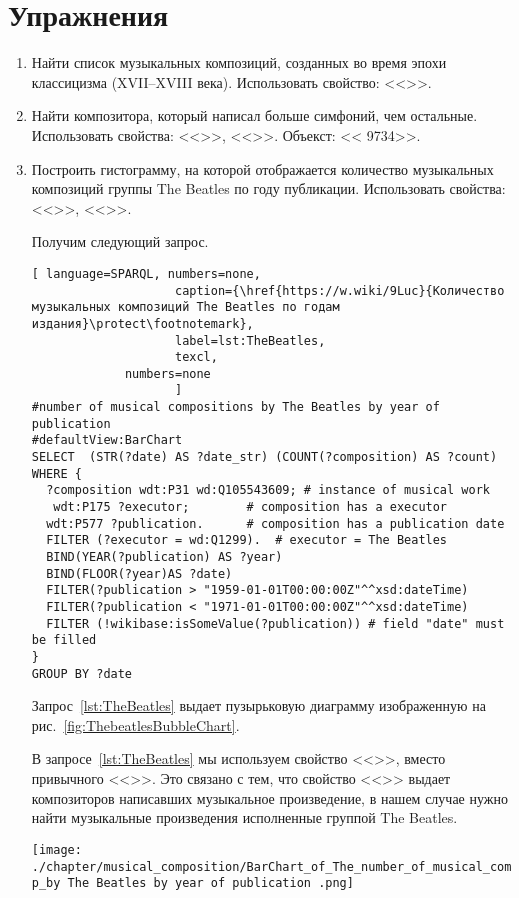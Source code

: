 \section{Упражнения}
\begin{enumerate}
\item Найти список музыкальных композиций, созданных во время эпохи классицизма (XVII--XVIII века).
Использовать свойство: <<>>.
\item Найти композитора, который написал больше симфоний, чем остальные.
Использовать свойства: <<>>, <<>>. Объекст: << {9734}>>.
\item Построить гистограмму, на которой отображается количество музыкальных композиций группы The Beatles по году публикации.
Использовать свойства: <<>>, <<>>.

Получим следующий запрос.

\begin{lstlisting}[ language=SPARQL, numbers=none,
                    caption={\href{https://w.wiki/9Luc}{Количество музыкальных композиций The Beatles по годам издания}\protect\footnotemark},
                    label=lst:TheBeatles,
                    texcl,
	         numbers=none
                    ]
#number of musical compositions by The Beatles by year of publication
#defaultView:BarChart
SELECT  (STR(?date) AS ?date_str) (COUNT(?composition) AS ?count)  
WHERE {
  ?composition wdt:P31 wd:Q105543609; # instance of musical work
   wdt:P175 ?executor;        # composition has a executor
  wdt:P577 ?publication.      # composition has a publication date
  FILTER (?executor = wd:Q1299).  # executor = The Beatles
  BIND(YEAR(?publication) AS ?year)
  BIND(FLOOR(?year)AS ?date)
  FILTER(?publication > "1959-01-01T00:00:00Z"^^xsd:dateTime)
  FILTER(?publication < "1971-01-01T00:00:00Z"^^xsd:dateTime) 
  FILTER (!wikibase:isSomeValue(?publication)) # field "date" must be filled
}
GROUP BY ?date
\end{lstlisting}%
Запрос~\ref{lst:TheBeatles} выдает пузырьковую диаграмму изображенную на рис.~\ref{fig:ThebeatlesBubbleChart}.

В запросе~\ref{lst:TheBeatles} мы используем свойство <<>>, вместо привычного <<>>. Это связано с тем, что свойство <<>> выдает композиторов написавших музыкальное произведение, в нашем случае нужно найти музыкальные произведения исполненные группой The Beatles.

\begin{figure*}
	\texttt{[image: ./chapter/musical\_composition/BarChart\_of\_The\_number\_of\_musical\_comp\_by The Beatles by year of publication .png]}
	\caption[Гистограмма количества музыкальных композиций The Beatles по годам издания]{Гистограмма количества музыкальных композиций The Beatles по годам издания}%
 	\label{fig:ThebeatlesBubbleChart}%
\end{figure*}
\end{enumerate}
